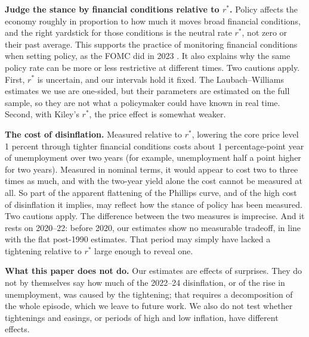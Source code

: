 \documentclass[11pt]{article}
\newcommand{\rs}{r^{*}}
\begin{document}
\textbf{Judge the stance by financial conditions relative to $\rs$.} Policy affects the economy roughly in proportion to how much it moves broad financial conditions, and the right yardstick for those conditions is the neutral rate $\rs$, not zero or their past average. This supports the practice of monitoring financial conditions when setting policy, as the FOMC did in 2023 \citep{powell2023}. It also explains why the same policy rate can be more or less restrictive at different times. Two cautions apply. First, $\rs$ is uncertain, and our intervals hold it fixed. The Laubach--Williams estimates we use are one-sided, but their parameters are estimated on the full sample, so they are not what a policymaker could have known in real time. Second, with Kiley's $\rs$, the price effect is somewhat weaker.

\textbf{The cost of disinflation.} Measured relative to $\rs$, lowering the core price level 1 percent through tighter financial conditions costs about 1 percentage-point year of unemployment over two years (for example, unemployment half a point higher for two years). Measured in nominal terms, it would appear to cost two to three times as much, and with the two-year yield alone the cost cannot be measured at all. So part of the apparent flattening of the Phillips curve, and of the high cost of disinflation it implies, may reflect how the stance of policy has been measured. Two cautions apply. The difference between the two measures is imprecise. And it rests on 2020--22: before 2020, our estimates show no measurable tradeoff, in line with the flat post-1990 estimates. That period may simply have lacked a tightening relative to $\rs$ large enough to reveal one.

\textbf{What this paper does not do.} Our estimates are effects of surprises. They do not by themselves say how much of the 2022--24 disinflation, or of the rise in unemployment, was caused by the tightening; that requires a decomposition of the whole episode, which we leave to future work. We also do not test whether tightenings and easings, or periods of high and low inflation, have different effects.
\end{document}

